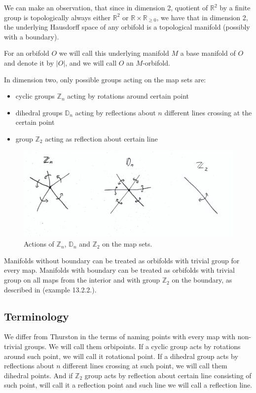 We can make an observation, that since in dimension 2, quotient of $\mathbb{R}^2$ by a finite 
group is topologically always either $\mathbb{R}^2$ or $\mathbb{R}\times\mathbb{R}_{\geq 0}$, 
we have that in dimension 2, the underlying Hausdorff space of any orbifold is a topological 
manifold (possibly with a boundary).

For an orbifold $O$ we will call this underlying manifold $M$
a base manifold of $O$ and denote it by $|O|$,
and we will call $O$ an $M$-orbifold.  

In dimension two, only possible groups acting on the map sets are:
\begin{itemize}
\item cyclic groups $\mathbb{Z}_n$ acting by rotations around certain point
\item dihedral groups $\mathbb{D}_n$ acting by reflections about $n$ different lines 
crossing at the certain point 
\item group $\mathbb{Z}_2$ acting as reflection about certain line
\end{itemize}
\begin{figure}[H]
\centering
\includegraphics[width=\textwidth]{"../introduction/ZnDnZ2.jpg"}
\caption{Actions of $\mathbb{Z}_n$, $\mathbb{D}_n$ and $\mathbb{Z}_2$ on the map sets.}
\end{figure}
Manifolds without boundary can be treated as orbifolds with trivial group for every map.
Manifolds with boundary can be treated as orbifolds with trivial group on all maps from the 
interior and with group $\mathbb{Z}_2$ on the boundary, as described in \cite{Thurston1979} 
(example 13.2.2.).

\subsection{Terminology}
We differ from Thurston in the terms of naming points with every map with non-trivial groups. 
We will call them orbipoints. If a cyclic group acts by rotations 
around such point, we will call it rotational point. 
If a dihedral group acts by reflections about $n$ different lines 
crossing at such point, we will 
call them 
dihedral points. And if $\mathbb{Z}_2$ group acts by reflection about certain line consisting 
of such point, will call it a 
reflection point and such line we will call a reflection line. 


